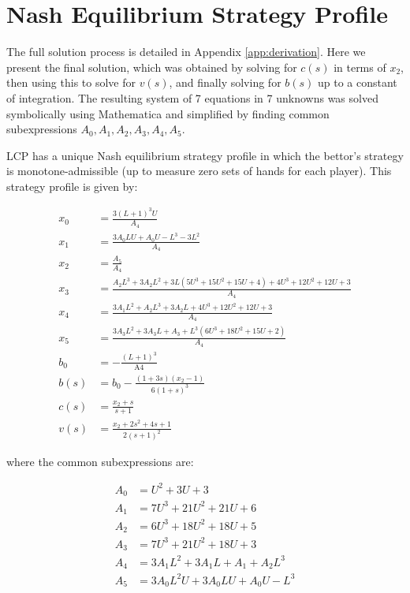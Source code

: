 \documentclass[../../main/main.tex]{subfiles}
\begin{document}
\section{Nash Equilibrium Strategy Profile}


The full solution process is detailed in Appendix \ref{app:derivation}. Here we present the final solution, which was obtained by solving for $c(s)$ in terms of $x_2$, then using this to solve for $v(s)$, and finally solving for $b(s)$ up to a constant of integration. The resulting system of 7 equations in 7 unknowns was solved symbolically using Mathematica and simplified by finding common subexpressions $A_0, A_1, A_2, A_3, A_4, A_5$. 

\begin{theorem}
    \label{thm:nash_equilibrium}
LCP has a unique Nash equilibrium strategy profile in which the bettor's strategy is monotone-admissible (up to measure zero sets of hands for each player). This strategy profile is given by:

\begin{align*}
    x_0 &= \frac{3 (L+1)^3 U}{A_4}\\
    x_1 &= \frac{3 A_0 L U+A_0 U-L^3-3 L^2}{A_4}\\
    x_2 &= \frac{A_5}{A_4}\\
    x_3 &= \frac{A_2 L^3+3 A_2 L^2+3 L \left(5 U^3+15 U^2+15 U+4\right)+4 U^3+12 U^2+12 U+3}{A_4}\\
    x_4 &= \frac{3 A_1 L^2+A_2 L^3+3 A_2 L+4 U^3+12 U^2+12 U+3}{A_4}\\
    x_5 &= \frac{3 A_3 L^2+3 A_3 L+A_3+L^3 \left(6 U^3+18 U^2+15 U+2\right)}{A_4}\\
    b_0 &= -\frac{(L+1)^3}{\text{A4}} \\ 
    b(s) &= b_0 - \frac{(1+3s)(x_2-1)}{6(1+s)^3}\\
    c(s) &= \frac{x_2+s}{s+1}\\
    v(s) &= \frac{x_2+2 s^2+4 s+1}{2 (s+1)^2}
\end{align*}

where the common subexpressions are:

\begin{align*}
	A_0 &= U^2+3 U+3 \\
    A_1 &= 7 U^3+21 U^2+21 U+6 \\
    A_2 &= 6 U^3+18 U^2+18 U+5 \\
    A_3 &= 7 U^3+21 U^2+18 U+3 \\
    A_4 &= 3 A_1 L^2+3 A_1 L+A_1+A_2 L^3 \\
    A_5 &= 3 A_0 L^2 U+3 A_0 L U+A_0 U-L^3
\end{align*}
\end{theorem}
\end{document}
